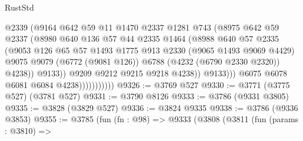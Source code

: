 \begin{lexlean}{RustStd}
\begin{coremodule}
                                  @2339
                                  (@9164
                                    @642
                                    @59
                                    @11
                                    @1470
                                    @2337
                                    @1281
                                    @743
                                    (@8975
                                      @642
                                      @59
                                      @2337
                                      (@8980
                                        @640
                                        @136
                                        @57
                                        @44
                                        @2335
                                        @1464
                                        (@8988
                                          @640
                                          @57
                                          @2335
                                          (@9053
                                            @126
                                            @65
                                            @57
                                            @1493
                                            @1775
                                            @913
                                            @2330
                                            (@9065 @1493 @9069 @4429)
                                            @9075
                                            @9079
                                            (@6772 (@9081 @126))
                                            @6788
                                            (@4232 (@6790 @2330 @2320))
                                            @4238))
                                        @9133))
                                    @9209
                                    @9212
                                    @9215
                                    @9218
                                    @4238))
                                @9133)))
                          @6075
                          @6078
                          @6081
                          @6084
                          @4238)))))))))))
@9326 := @3769 @527
@9330 := @3771 (@3775 @527) (@3781 @527)
@9331 := @3790 @8126
@9333 := @3786 (@9331 @3805)
@9335 := @3828 (@3829 @527)
@9336 := @3824 @9335
@9338 := @3786 (@9336 @3853)
@9355 := @3785
    (fun (fn : @98) =>
    @9333
      (@3808
        (@3811
          (fun (params : @3810) =>

\end{coremodule}
\end{lexlean}

